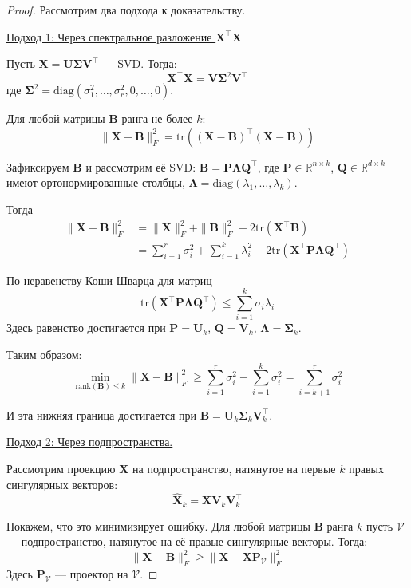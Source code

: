 \begin{proof}
    Рассмотрим два подхода к доказательству.
    
    \underline{Подход 1: Через спектральное разложение $\bm{X}^\top\bm{X}$}
    
    Пусть $\bm{X} = \bm{U}\bm{\Sigma}\bm{V}^\top$ --- SVD\@.
    Тогда:
    \[ \bm{X}^\top\bm{X} = \bm{V}\bm{\Sigma}^2\bm{V}^\top \]
    где $\bm{\Sigma}^2 = \text{diag}(\sigma_1^2, \dots, \sigma_r^2, 0, \dots, 0)$.
    
    Для любой матрицы $\bm{B}$ ранга не более $k$:
    \[ \|\bm{X} - \bm{B}\|_F^2 = \text{tr}((\bm{X} - \bm{B})^\top(\bm{X} - \bm{B})) \]
    
    Зафиксируем $\bm{B}$ и рассмотрим её SVD: $\bm{B} = \bm{P}\bm{\Lambda}\bm{Q}^\top$, где $\bm{P} \in \mathbb{R}^{n \times k}$, $\bm{Q} \in \mathbb{R}^{d \times k}$ имеют ортонормированные столбцы, $\bm{\Lambda} = \text{diag}(\lambda_1, \dots, \lambda_k)$.
    
    Тогда
    \begin{align*}
        \|\bm{X} - \bm{B}\|_F^2 &= \|\bm{X}\|_F^2 + \|\bm{B}\|_F^2 - 2\text{tr}(\bm{X}^\top\bm{B}) \\
        &= \sum_{i=1}^r \sigma_i^2 + \sum_{i=1}^k \lambda_i^2 - 2\text{tr}(\bm{X}^\top\bm{P}\bm{\Lambda}\bm{Q}^\top)
    \end{align*}
    
    По неравенству Коши-Шварца для матриц
    \[ \text{tr}(\bm{X}^\top\bm{P}\bm{\Lambda}\bm{Q}^\top) \leq \sum_{i=1}^k \sigma_i \lambda_i \]
    Здесь равенство достигается при $\bm{P} = \bm{U}_k$, $\bm{Q} = \bm{V}_k$, $\bm{\Lambda} = \bm{\Sigma}_k$.
    
    Таким образом:
    \[ \min_{\text{rank}(\bm{B}) \leq k} \|\bm{X} - \bm{B}\|_F^2 \geq \sum_{i=1}^r \sigma_i^2 - \sum_{i=1}^k
    \sigma_i^2 = \sum_{i=k+1}^r \sigma_i^2 \]
    
    И эта нижняя граница достигается при $\bm{B} = \bm{U}_k\bm{\Sigma}_k\bm{V}_k^\top$.
    
    \underline{Подход 2: Через подпространства.}
    
    Рассмотрим проекцию $\bm{X}$ на подпространство, натянутое на первые $k$ правых сингулярных векторов:
    \[ \hat{\bm{X}}_k = \bm{X}\bm{V}_k\bm{V}_k^\top \]
    
    Покажем, что это минимизирует ошибку.
    Для любой матрицы $\bm{B}$ ранга $k$ пусть $\mathcal{V}$ --- подпространство, натянутое на её правые сингулярные
    векторы.
    Тогда:
    \[ \|\bm{X} - \bm{B}\|_F^2 \geq \|\bm{X} - \bm{X}\bm{P}_{\mathcal{V}}\|_F^2 \]
    Здесь $\bm{P}_{\mathcal{V}}$ --- проектор на $\mathcal{V}$.
    

\end{proof}
